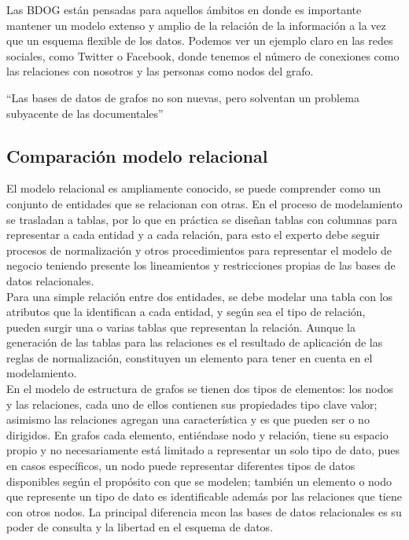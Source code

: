 \documentclass[preprint,12pt]{elsarticle}
\begin{document}
Las BDOG están pensadas para aquellos ámbitos en donde es importante mantener un modelo extenso y amplio de la relación de la información a la vez que un esquema flexible de los datos. Podemos ver un ejemplo claro en las redes sociales, como Twitter o Facebook, donde tenemos el número de conexiones como las relaciones con nosotros y las personas como nodos del grafo.

“Las bases de datos de grafos no son nuevas, pero solventan un problema subyacente de las documentales”



\subsection{\textbf{Comparación modelo relacional}}
El modelo relacional es ampliamente conocido, se puede comprender como un conjunto de entidades que se relacionan con otras. En el proceso de modelamiento se trasladan a tablas, por lo que en práctica se diseñan tablas con columnas para representar a cada entidad y a cada relación, para esto el experto debe seguir procesos de normalización y otros procedimientos para representar el modelo de negocio teniendo presente los lineamientos y restricciones propias de las bases de datos relacionales.\\

Para una simple relación entre dos entidades, se debe modelar una tabla con los atributos que la identifican a cada entidad, y según sea el tipo de relación, pueden surgir una o varias tablas que representan la relación. Aunque la generación de las tablas para las relaciones es el resultado de aplicación de las reglas de normalización, constituyen un elemento para tener en cuenta en el modelamiento.\\

En el modelo de estructura de grafos se tienen dos tipos de elementos: los nodos y las relaciones, cada uno de ellos contienen sus propiedades tipo clave valor; asimismo las relaciones agregan una característica y es que pueden ser o no dirigidos. En grafos cada elemento, entiéndase nodo y relación, tiene su espacio propio y no necesariamente está limitado a representar un solo tipo de dato, pues en casos específicos, un nodo puede representar diferentes tipos de datos disponibles según el propósito con que se modelen; también un elemento o nodo que represente un tipo de dato es identificable además por las relaciones que tiene con otros nodos. La principal diferencia mcon las bases de datos relacionales es su poder de consulta y la libertad en el esquema de datos.\\
\end{document}

